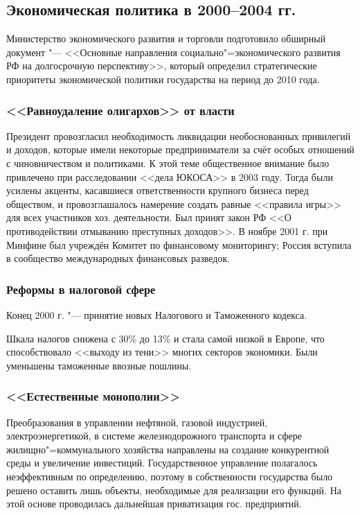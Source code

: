 \subsection{Экономическая политика в 2000--2004 гг.}
Министерство экономического развития и торговли подготовило обширный документ "--- <<Основные направления социально"=экономического развития РФ на долгосрочную перспективу>>, который определил стратегические приоритеты экономической политики государства на период до 2010 года.

\subsubsection{<<Равноудаление олигархов>> от власти}
Президент провозгласил необходимость ликвидации необоснованных привилегий и доходов, которые имели некоторые предприниматели за счёт особых отношений с чиновничеством и политиками. К этой теме общественное внимание было привлечено при расследовании <<дела ЮКОСА>> в 2003 году. Тогда были усилены акценты, касавшиеся ответственности крупного бизнеса перед обществом, и провозглашалось намерение создать равные <<правила игры>> для всех участников хоз. деятельности. Был принят закон РФ <<О противодействии отмыванию преступных доходов>>. В ноябре 2001 г. при Минфине был учреждён Комитет по финансовому мониторингу; Россия вступила в сообщество международных финансовых разведок.

\subsubsection{Реформы в налоговой сфере}
Конец 2000 г. "--- принятие новых Налогового и Таможенного кодекса.

Шкала налогов снижена с 30\% до 13\% и стала самой низкой в Европе, что способствовало <<выходу из тени>> многих секторов экономики. Были уменьшены таможенные ввозные пошлины.

\subsubsection{<<Естественные монополии>>}
Преобразования в управлении нефтяной, газовой индустрией, электроэнергетикой, в системе железнодорожного транспорта и сфере жилищно"=коммунального хозяйства направлены на создание конкурентной среды и увеличение инвестиций. Государственное управление полагалось неэффективным по определению, поэтому в собственности государства было решено оставить лишь объекты, необходимые для реализации его функций. На этой основе проводилась дальнейшая приватизация гос. предприятий.

